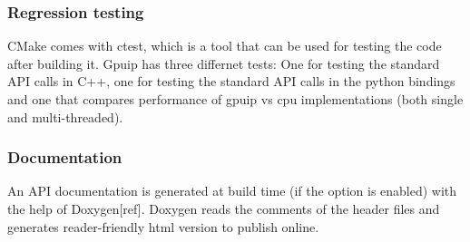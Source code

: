 \subsubsection{Regression testing}
CMake comes with ctest, which is a tool that can be used for testing the code after building it. Gpuip has three differnet tests: One for testing the standard API calls in C++, one for testing the standard API calls in the python bindings and one that compares performance of gpuip vs cpu implementations (both single and multi-threaded).

\subsubsection{Documentation}
An API documentation is generated at build time (if the option is enabled) with the help of Doxygen[ref]. Doxygen reads the comments of the header files and generates reader-friendly html version to publish online. 
